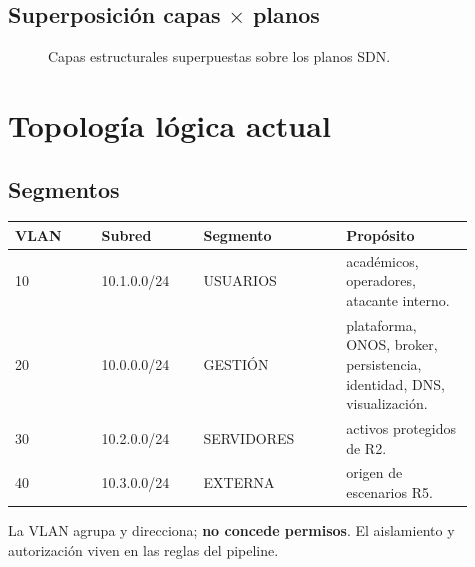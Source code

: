 \documentclass[11pt,a4paper]{article}
\begin{document}
\subsection{Superposición capas $\times$ planos}

\begin{figure}[H]
\centering
{}
\caption{Capas estructurales superpuestas sobre los planos SDN.}
\end{figure}

\section{Topología lógica actual}

\subsection{Segmentos}

\begin{longtable}{p{0.17\linewidth}p{0.2\linewidth}p{0.29\linewidth}p{0.25\linewidth}}
\toprule
VLAN & Subred & Segmento & Propósito\\
\midrule
10 & 10.1.0.0/24 & USUARIOS & académicos, operadores, atacante interno.\\
20 & 10.0.0.0/24 & GESTIÓN & plataforma, ONOS, broker, persistencia, identidad, DNS, visualización.\\
30 & 10.2.0.0/24 & SERVIDORES & activos protegidos de R2.\\
40 & 10.3.0.0/24 & EXTERNA & origen de escenarios R5.\\
\bottomrule
\end{longtable}

La VLAN agrupa y direcciona; \textbf{no concede permisos}. El aislamiento y autorización viven en las reglas del pipeline.
\end{document}
